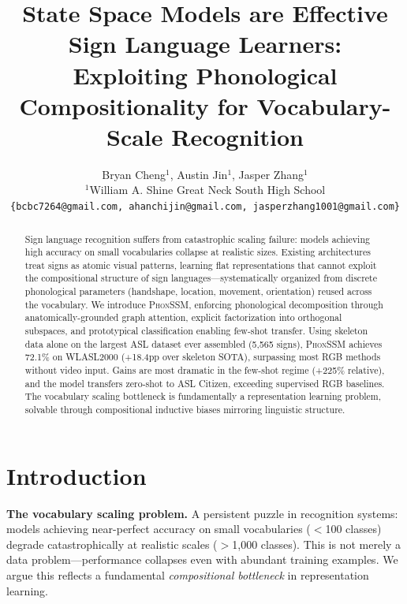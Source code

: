 \documentclass{article}
\title{State Space Models are Effective Sign Language Learners:\\Exploiting Phonological Compositionality for Vocabulary-Scale Recognition}
\author{Bryan Cheng$^{1}$, Austin Jin$^{1}$, Jasper Zhang$^{1}$ \\
$^{1}$William A. Shine Great Neck South High School \\
\texttt{\{bcbc7264@gmail.com, ahanchijin@gmail.com, jasperzhang1001@gmail.com\}} \\
}
\theoremstyle{definition}
\theoremstyle{remark}
\newcommand{\phonssm}{\textsc{PhonSSM}}
\begin{document}
\maketitle
\thispagestyle{fancy}
\fancyhf{}
\cfoot{\thepage}
\pagestyle{fancy}
\fancyhead{}
\fancyfoot{}
\fancyfoot[C]{\thepage}

\begin{abstract}
Sign language recognition suffers from catastrophic scaling failure: models achieving high accuracy on small vocabularies collapse at realistic sizes. Existing architectures treat signs as atomic visual patterns, learning flat representations that cannot exploit the compositional structure of sign languages---systematically organized from discrete phonological parameters (handshape, location, movement, orientation) reused across the vocabulary. We introduce \phonssm{}, enforcing phonological decomposition through anatomically-grounded graph attention, explicit factorization into orthogonal subspaces, and prototypical classification enabling few-shot transfer. Using skeleton data alone on the largest ASL dataset ever assembled (5,565 signs), \phonssm{} achieves 72.1\% on WLASL2000 (+18.4pp over skeleton SOTA), surpassing most RGB methods without video input. Gains are most dramatic in the few-shot regime (+225\% relative), and the model transfers zero-shot to ASL Citizen, exceeding supervised RGB baselines. The vocabulary scaling bottleneck is fundamentally a representation learning problem, solvable through compositional inductive biases mirroring linguistic structure.
\end{abstract}

\section{Introduction}

\textbf{The vocabulary scaling problem.} A persistent puzzle in recognition systems: models achieving near-perfect accuracy on small vocabularies ($<$100 classes) degrade catastrophically at realistic scales ($>$1,000 classes). This is not merely a data problem---performance collapses even with abundant training examples. We argue this reflects a fundamental \textit{compositional bottleneck} in representation learning.
\end{document}
